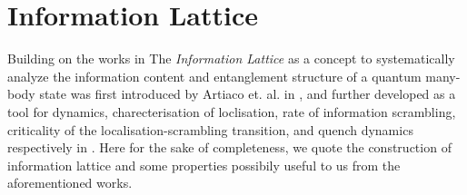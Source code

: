 \section{Information Lattice}

Building on the works in \cite{Bardarson2022TimeEvolutionSciPostPhys} The \textit{Information Lattice} as a concept to systematically analyze the information content and entanglement structure of a quantum many-body state was first introduced by Artiaco et. al. in \cite{Artiaco2024EfficientLargePRXQuantum}, and further developed as a tool for dynamics, charecterisation of loclisation, rate of information scrambling, criticality of the localisation-scrambling transition, and quench dynamics respectively in \cite{Artiaco2024EfficientLargePRXQuantum,Artiaco2024UltraslowGrowthPhysRevLett,Artiaco2025UniversalCharacterizationPhysRevLett,Artiaco2025LocalInformationPhysRevA}. Here for the sake of completeness, we quote the construction of information lattice and some properties possibily useful to us from the aforementioned works.